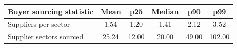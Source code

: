 \begin{tabular}{lccccc}
\toprule
Buyer sourcing statistic & Mean & p25 & Median & p90 & p99 \\
\midrule
Suppliers per sector & 1.54 & 1.20 & 1.41 & 2.12 & 3.52 \\
Supplier sectors sourced & 25.24 & 12.00 & 20.00 & 49.00 & 102.00 \\
\bottomrule
\end{tabular}
